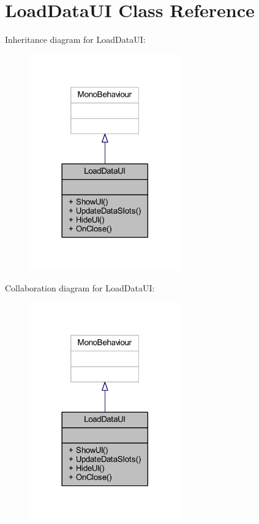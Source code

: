 \hypertarget{class_load_data_u_i}{}\section{Load\+Data\+UI Class Reference}
\label{class_load_data_u_i}


Inheritance diagram for Load\+Data\+UI\+:\nopagebreak
\begin{figure}[H]
\begin{center}
\leavevmode
\includegraphics[width=185pt]{class_load_data_u_i__inherit__graph}
\end{center}
\end{figure}


Collaboration diagram for Load\+Data\+UI\+:\nopagebreak
\begin{figure}[H]
\begin{center}
\leavevmode
\includegraphics[width=185pt]{class_load_data_u_i__coll__graph}
\end{center}
\end{figure}
